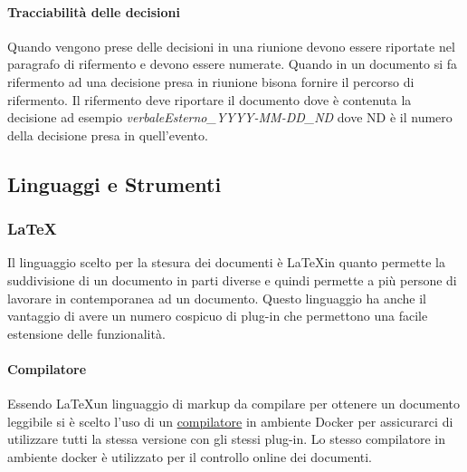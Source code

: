     \paragraph{Tracciabilità delle decisioni}
      Quando vengono prese delle decisioni in una riunione devono essere
      riportate nel paragrafo di rifermento e devono essere numerate.
      Quando in un documento si fa rifermento ad una decisione presa in riunione
      bisona fornire il percorso di rifermento.
      Il rifermento deve riportare il documento dove è contenuta la decisione
      ad esempio \textit{verbaleEsterno_YYYY-MM-DD_ND} dove ND è il numero della
      decisione presa in quell'evento.


  \subsection{Linguaggi e Strumenti}
  \subsubsection{\LaTeX}
  Il linguaggio scelto per la stesura dei documenti è \LaTeX \space in quanto permette
  la suddivisione di un documento in parti diverse e quindi permette a più persone
  di lavorare in contemporanea ad un documento.
  Questo linguaggio ha anche il vantaggio di avere un numero cospicuo di plug-in
  che permettono una facile estensione delle funzionalità.

  \paragraph{Compilatore}
  Essendo \LaTeX \space un linguaggio di markup da compilare per ottenere un documento
  leggibile si è scelto l'uso di un
  \href{https://github.com/dante-ev/docker-texlive}{compilatore} in ambiente Docker\glo
  per assicurarci di utilizzare tutti la stessa versione con gli stessi plug-in.
  Lo stesso compilatore in ambiente docker è utilizzato per il controllo online dei
  documenti.
